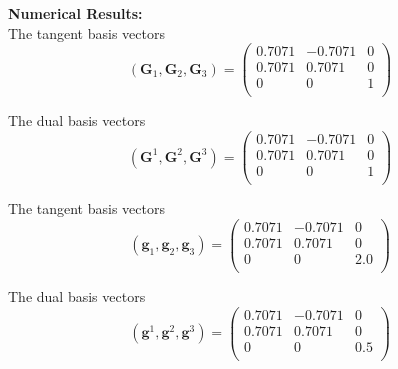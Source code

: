 \documentclass[../main.tex]{subfiles}
\begin{document}
\begin{minipage}[t]{0.5\textwidth}
  \textbf{Numerical Results:}\\
		
  The tangent basis vectors
  \[
  \left(\mathbf{G}_1,\mathbf{G}_2,\mathbf{G}_3\right)=
  \begin{pmatrix}
    0.7071 & -0.7071 & 0\\
    0.7071 &  0.7071 & 0\\
    0      &  0      & 1\\
  \end{pmatrix}
  \]
  \vspace{13mm}
	
  The dual basis vectors
  \[
  \left(\mathbf{G}^1,\mathbf{G}^2,\mathbf{G}^3\right)=
  \begin{pmatrix}
    0.7071 & -0.7071 & 0\\
    0.7071 &  0.7071 & 0\\
    0      &  0      & 1\\
  \end{pmatrix}
  \]
  \vspace{13mm}
	
  The tangent basis vectors
  \[
  \left(\mathbf{g}_1,\mathbf{g}_2,\mathbf{g}_3\right)=
  \begin{pmatrix}
    0.7071 & -0.7071 & 0\\
    0.7071 &  0.7071 & 0\\
    0      &  0      & 2.0\\
  \end{pmatrix}
  \]
  \vspace{13mm}
	
  The dual basis vectors
  \[
  \left(\mathbf{g}^1,\mathbf{g}^2,\mathbf{g}^3\right)=
  \begin{pmatrix}
    0.7071 & -0.7071 & 0\\
    0.7071 &  0.7071 & 0\\
    0      &  0      & 0.5\\
  \end{pmatrix}
  \]
  \vspace{13mm}
\end{minipage}
	
\end{document}
